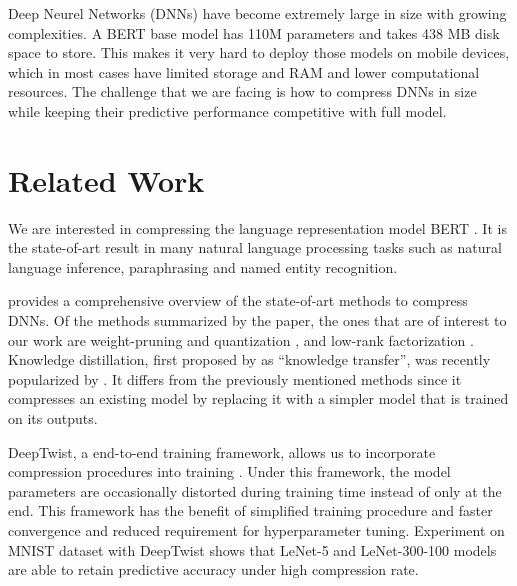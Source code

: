 \documentclass[11pt]{article}
\begin{document}
Deep Neurel Networks (DNNs) have become extremely large in size with growing complexities. A BERT base model has 110M parameters and takes 438 MB disk space to store. This makes it very hard to deploy those models on mobile devices, which in most cases have limited storage and RAM and lower computational resources. The challenge that we are facing is how to compress DNNs in size while keeping their predictive performance competitive with full model.

\section{Related Work}


We are interested in compressing the language representation model BERT \citep{devlin2018bert}. 
It is the state-of-art result in many natural language processing tasks 
such as natural language inference, paraphrasing and named entity recognition.

\citet{cheng2017survey} provides a comprehensive overview of the state-of-art methods to compress DNNs. Of the methods summarized by the paper, the ones that are of interest to our work are weight-pruning and quantization \cite{han2015deep}, and low-rank factorization \cite{denton2014exploiting}. Knowledge distillation, first proposed by \cite{bucilua2006model} as ``knowledge transfer'', was recently popularized by \cite{hinton2015distilling}. It differs from the previously mentioned methods since it compresses an existing model by replacing it with a simpler model that is trained on its outputs.

DeepTwist, a end-to-end training framework, allows us to incorporate compression procedures into training \citep{lee2018deeptwist}. Under this framework, the model parameters are occasionally distorted during training time instead of only at the end. This framework has the benefit of simplified training procedure and faster convergence and reduced requirement for hyperparameter tuning. Experiment on MNIST dataset with DeepTwist shows that LeNet-5 and LeNet-300-100 models are able to retain predictive accuracy under high compression rate.
\end{document}
